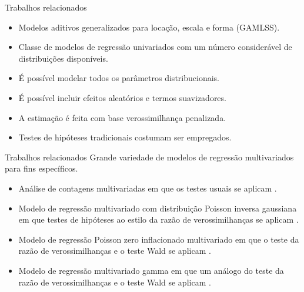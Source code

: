 \documentclass[
  ignorenonframetext,
  serif,
  professionalfont,
  usenames,
  dvipsnames,
  aspectratio = 169]{beamer}
\begin{document}
\begin{frame}{Trabalhos relacionados}
\protect\hypertarget{trabalhos-relacionados-4}{}
\begin{itemize}
  \itemsep 2ex
  
  \item Modelos aditivos generalizados para locação, escala e forma (GAMLSS). 
 
  \item Classe de modelos de regressão univariados com um número considerável de distribuições disponíveis. 
 
  \item É possível modelar todos os parâmetros distribucionais.
 
  \item É possível incluir efeitos aleatórios e termos suavizadores. 
 
  \item A estimação é feita com base verossimilhança penalizada.
 
  \item Testes de hipóteses tradicionais costumam ser empregados.
 
\end{itemize}
\end{frame}

\begin{frame}{Trabalhos relacionados}
\protect\hypertarget{trabalhos-relacionados-5}{}
Grande variedade de modelos de regressão multivariados para fins
específicos.

\begin{itemize}
  \itemsep 2ex
  
  \item Análise de contagens multivariadas em que os testes usuais se aplicam \citep{zhang2017regression}.  

  \item Modelo de regressão multivariado com distribuição Poisson inversa gaussiana em que testes de hipóteses ao estilo da razão de verossimilhanças se aplicam \citep{mardalena2020parameter}. 

  \item Modelo de regressão Poisson zero inflacionado multivariado em que o teste da razão de verossimilhanças e o teste Wald se aplicam \citep{sari2021estimation}.
  
  \item Modelo de regressão multivariado gamma em que um análogo do teste da razão de verossimilhanças e o teste Wald se aplicam \citet{rahayu2020multivariate}.

\end{itemize}
\end{frame}
\end{document}
